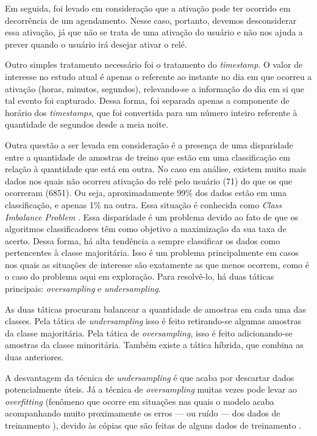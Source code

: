 			Em seguida, foi levado em consideração que a ativação pode ter ocorrido em decorrência de um agendamento. Nesse caso, portanto, devemos desconsiderar essa ativação, já que não se trata de uma ativação do usuário e não nos ajuda a prever quando o usuário irá desejar ativar o relé.

			Outro simples tratamento necessário foi o tratamento do \emph{timestamp}. O valor de interesse no estudo atual é apenas o referente ao instante no dia em que ocorreu a ativação (horas, minutos, segundos), relevando-se a informação do dia em si que tal evento foi capturado. Dessa forma, foi separada apenas a componente de horário dos \emph{timestamps}, que foi convertida para um número inteiro referente à quantidade de segundos desde a meia noite.

			Outra questão a ser levada em consideração é a presença de uma disparidade entre a quantidade de amostras de treino que estão em uma classificação em relação à quantidade que está em outra. No caso em análise, existem muito mais dados nos quais não ocorreu ativação do relé pelo usuário (71) do que os que ocorreram (6851). Ou seja, aproximadamente 99\% dos dados estão em uma classificação, e apenas 1\% na outra. Essa situação é conhecida como \emph{Class Imbalance Problem} \cite{classImbalanceProblem}. Essa disparidade é um problema devido ao fato de que os algoritmos classificadores têm como objetivo a maximização da sua taxa de acerto. Dessa forma, há alta tendência a sempre classificar os dados como pertencentes à classe majoritária. Isso é um problema principalmente em casos nos quais as situações de interesse são exatamente as que menos ocorrem, como é o caso do problema aqui em exploração. Para resolvê-lo, há duas táticas principais: \emph{oversampling} e \emph{undersampling}.

			As duas táticas procuram balancear a quantidade de amostras em cada uma das classes. Pela tática de \emph{undersampling} isso é feito retirando-se algumas amostras da classe majoritária. Pela tática de \emph{oversampling}, isso é feito adicionando-se amostras da classe minoritária. Também existe a tática híbrida, que combina as duas anteriores.

			A desvantagem da técnica de \emph{undersampling} é que acaba por descartar dados potencialmente úteis. Já a técnica de \emph{oversampling} muitas vezes pode levar ao \emph{overfitting} (fenômeno que ocorre em situações nas quais o modelo acaba acompanhando muito proximamente os erros --- ou ruído --- dos dados de treinamento \cite{islr}), devido às cópias que são feitas de alguns dados de treinamento \cite{unbalancedClassArticle}.

